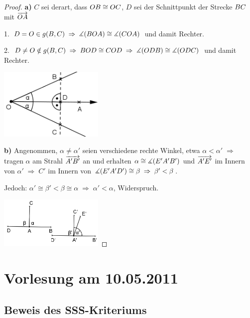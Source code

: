 \begin{proof}
{\bf a)} 
$C$ sei derart, dass ${OB}\cong{OC}$, $D$ sei
der Schnittpunkt der Strecke ${BC}$ mit $\mbox{${\overrightarrow{OA}}$}$

1. $D=O\in g(B,C)\;\Rightarrow\;\mbox{$\measuredangle$}(BOA)\cong\mbox{$\measuredangle$}(COA)$ und damit
Rechter.

2. $D\neq O\notin g(B,C)\;\Rightarrow\; BOD\cong COD \;
\Rightarrow\;\mbox{$\measuredangle$}(ODB)\cong\mbox{$\measuredangle$}(ODC)$ und damit Rechter.

\centerline{\includegraphics[width=5cm]{BILDER/1-2-18a-Winkel.png}}



{\bf b)} Angenommen, $\alpha\neq\alpha'$ seien verschiedene rechte
Winkel, etwa $\alpha<\alpha'\;\Rightarrow$ tragen $\alpha$ am
Strahl $\mbox{${\overrightarrow{A'B'}}$}$ an und erhalten $\alpha\cong\mbox{$\measuredangle$}(E'A'B')$ und
$\mbox{${\overrightarrow{A'E'}}$}$ im Innern von $\alpha'\;\Rightarrow\;C'$ im Innern von
$\mbox{$\measuredangle$}(E'A'D')\cong\beta\;\Rightarrow\;\beta'<\beta$.

Jedoch: $\alpha'\cong\beta'<\beta\cong\alpha\;
\Rightarrow\;\alpha'<\alpha$, Widerspruch. 


\centerline{\includegraphics[width=5cm]{BILDER/1-2-18b-Winkel.png}}


\end{proof}





\section*{Vorlesung am 10.05.2011}






\subsection*{Beweis des SSS-Kriteriums}

